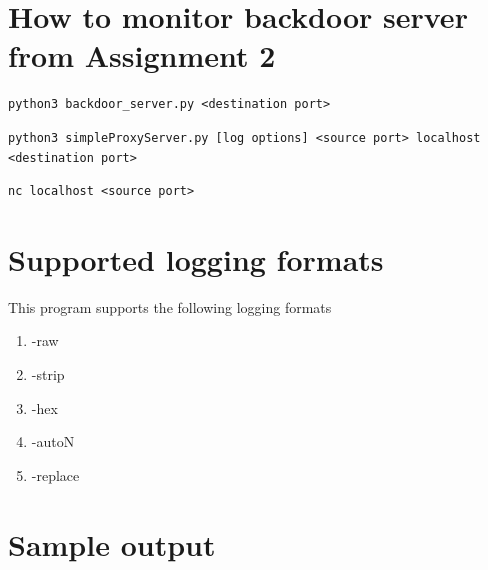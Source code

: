 \documentclass[11pt]{article}
\begin{document}
\section{How to monitor backdoor server from Assignment 2}
\begin{lstlisting}[style=terminal, title={Terminal 1: Run backdoor server}]
python3 backdoor_server.py <destination port>
\end{lstlisting}
\begin{lstlisting}[style=terminal, title={Terminal 2: Run the proxy server}]
python3 simpleProxyServer.py [log options] <source port> localhost <destination port>
\end{lstlisting}
\begin{lstlisting}[style=terminal, title={Terminal 3: Run NetCat}]
nc localhost <source port>
\end{lstlisting}

\section{Supported logging formats}
This program supports the following logging formats
\begin{enumerate}
\item -raw
\item -strip
\item -hex
\item -autoN
\item -replace
\end{enumerate}

\section{Sample output}
\end{document}
